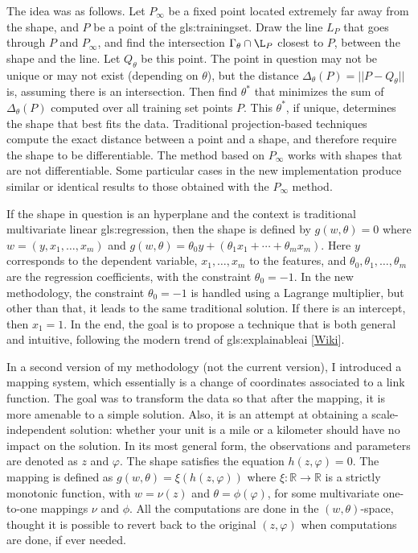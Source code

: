 \documentclass[oneside,10pt]{book}
\begin{document}
The idea was as follows. Let $P_\infty$ be a fixed point located extremely far away from the shape, and $P$ be a point of the \gls{gls:trainingset}. Draw the line
 $L_P$ that goes through $P$ and $P_\infty$, and find the intersection $\Gamma_\theta \cap \L_P$ closest to $P$, between the shape and the line. Let $Q_\theta$ be this point. The point in question may not be unique or may not exist (depending on $\theta$), but the distance $\Delta_\theta(P)=||P-Q_\theta||$ is, assuming there is an intersection. Then find $\theta^*$ that 
minimizes the sum of $\Delta_\theta(P)$ computed over all training set points $P$. This $\theta^*$, if unique, determines the shape that best fits the data. Traditional projection-based techniques compute the exact distance between a point and a shape, and therefore require the shape to be differentiable. The method based on
 $P_\infty$ works with shapes that are not differentiable. Some particular cases in the new implementation produce similar or identical results to those obtained with the $P_\infty$ method.

If the shape in question is an hyperplane and the context is traditional multivariate linear \gls{gls:regression}, then the shape is defined by 
$g(w,\theta)=0$ where $w=(y,x_1,\dots,x_m)$ and $g(w,\theta)=\theta_0 y+(\theta_1 x_1+\cdots +\theta_m x_m)$. Here $y$ corresponds to the dependent variable, $x_1,\dots, x_m$ to the features, and $\theta_0, \theta_1,\dots,\theta_m$ are the regression coefficients, with the constraint 
$\theta_0=-1$. In the new methodology, the constraint $\theta_0=-1$ is handled using a Lagrange multiplier, but other than that, it leads to the same traditional solution. If there is an intercept, then $x_1=1$. In the end, the goal is to propose a technique that is both general and intuitive,
 following the modern trend of \gls{gls:explainableai} [\href{https://en.wikipedia.org/wiki/Explainable_artificial_intelligence}{Wiki}].

In a second version of my methodology (not the current version), I introduced a mapping system, which essentially is a change of coordinates 
 associated to a link function. The
 goal was to transform the data so that after the mapping, it is more amenable to a simple solution. Also, it is an attempt at
 obtaining a scale-independent solution: whether your unit is a mile or a kilometer should have no impact on the solution. In its most general form, the observations and parameters are denoted as $z$ and $\varphi$. The shape satisfies the equation $h(z,\varphi)=0$. The mapping is defined as 
$g(w,\theta)=\xi(h(z,\varphi))$ where $\xi : \mathbb{R} \rightarrow \mathbb{R}$ is a strictly monotonic function, with $w=\nu(z)$ and $\theta
 = \phi(\varphi)$, for some multivariate one-to-one mappings $\nu$ and $\phi$. All the computations are done in the $(w,\theta)$-space, thought it is possible to revert back to the original $(z,\varphi)$ when computations are done, if ever needed. 
\end{document}

